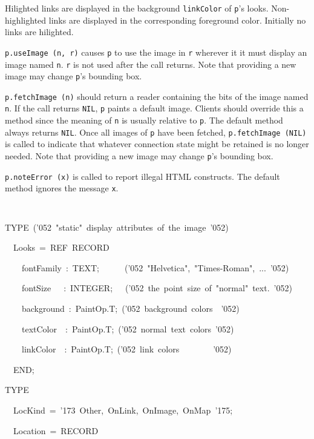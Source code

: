 {{   Hilighted links are displayed in the background {\tt linkColor} of {\tt p}'s
   looks.  Non-highlighted links are displayed in the corresponding
   foreground color.  Initially no links are hilighted.
\par
   {\tt p.useImage (n, r)} causes {\tt p} to use the image in {\tt r} wherever it
   it must display an image named {\tt n}.  {\tt r} is not used after the
   call returns.  Note that providing a new image may change {\tt p}'s
   bounding box.
\par
   {\tt p.fetchImage (n)} should return a reader containing the bits
   of the image named {\tt n}.  If the call returns {\tt NIL}, {\tt p} paints
   a default image.  Clients should override this a method since
   the meaning of {\tt n} is usually relative to {\tt p}.  The default
   method always returns {\tt NIL}.  Once all images of {\tt p} have been
   fetched, {\tt p.fetchImage (NIL)} is called to indicate that whatever
   connection state might be retained is no longer needed.  Note that
   providing a new image may change {\tt p}'s bounding box.
\par
   {\tt p.noteError (x)} is called to report illegal HTML constructs.
   The default method ignores the message {\tt x}.
\par}\par{\tt\parskip=0pt\parindent=0pt\progmode
\par\medskip \par\medskip
\tab TYPE~(\char'052{}~"static"~display~attributes~of~the~image~\char'052{})\par
\tab ~~Looks~=~REF~RECORD\par
\tab ~~~~fontFamily~:~TEXT;~~~~~~(\char'052{}~"Helvetica",~"Times-Roman",~...~\char'052{})\par
\tab ~~~~fontSize~~~:~INTEGER;~~~(\char'052{}~the~point~size~of~"normal"~text.~\char'052{})\par
\tab ~~~~background~:~PaintOp.T;~(\char'052{}~background~colors~~\char'052{})\par
\tab ~~~~textColor~~:~PaintOp.T;~(\char'052{}~normal~text~colors~\char'052{})\par
\tab ~~~~linkColor~~:~PaintOp.T;~(\char'052{}~link~colors~~~~~~~~\char'052{})\par
\tab ~~END;\par\medskip
\tab TYPE\par
\tab ~~LocKind~=~\char'173{}~Other,~OnLink,~OnImage,~OnMap~\char'175{};\par\medskip
\tab ~~Location~=~RECORD\par
}}
